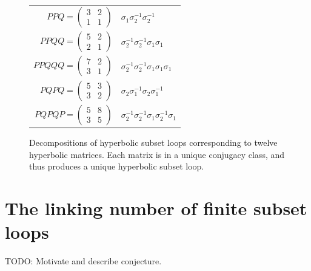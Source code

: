 \documentclass[12pt,twoside]{reedthesis}
\theoremstyle{definition}
\newcommand{\TODO}[1]{{\color{todopink}\textsf{TODO: #1}}}
\begin{document}
\begin{figure}[p]
\begin{tabular}{r l}
   $PPQ = \begin{pmatrix}3 & 2 \\ 1 & 1\end{pmatrix}$ & $\sigma_1 \sigma_2^{-1} \sigma_2^{-1}$ \\[1em]
   $PPQQ = \begin{pmatrix}5 & 2 \\ 2 & 1\end{pmatrix}$ & $\sigma_2^{-1} \sigma_2^{-1} \sigma_1 \sigma_1$ \\[1em]
   $PPQQQ = \begin{pmatrix}7 & 2 \\ 3 & 1\end{pmatrix}$ & $\sigma_2^{-1} \sigma_2^{-1} \sigma_1 \sigma_1 \sigma_1$ \\[1em]
   $PQPQ = \begin{pmatrix}5 & 3 \\ 3 & 2\end{pmatrix}$ & $\sigma_2 \sigma_1^{-1} \sigma_2 \sigma_1^{-1}$ \\[1em]
   $PQPQP = \begin{pmatrix}5 & 8 \\ 3 & 5\end{pmatrix}$ & $\sigma_2^{-1} \sigma_2^{-1} \sigma_1 \sigma_2^{-1} \sigma_1$
  \end{tabular}
  \caption{Decompositions of hyperbolic subset loops corresponding to twelve hyperbolic matrices. Each matrix is in a unique conjugacy class, and thus produces a unique hyperbolic subset loop.}
  \label{fig:subset_loop_decompositions_table}
\end{figure}


\section{The linking number of finite subset loops}

\TODO{Motivate and describe conjecture.}

\newpage
\appendix

\end{document}
